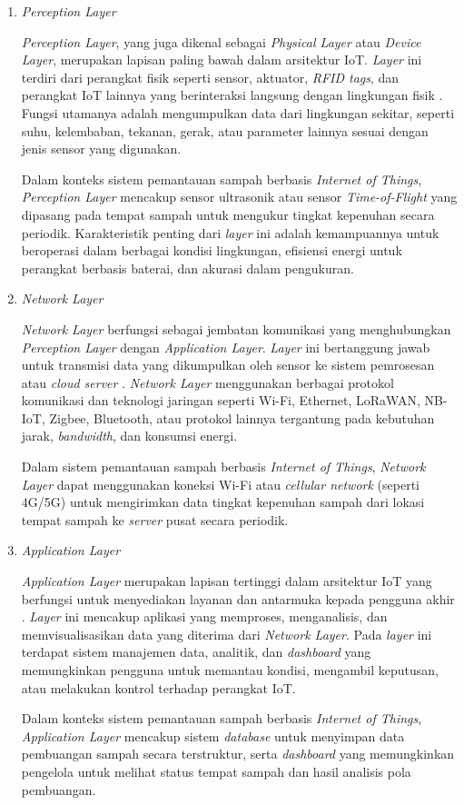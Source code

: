 \begin{enumerate}
  \item \textit{Perception Layer}

  \textit{Perception Layer}, yang juga dikenal sebagai \textit{Physical Layer} atau \textit{Device Layer}, merupakan lapisan paling bawah dalam arsitektur IoT. \textit{Layer} ini terdiri dari perangkat fisik seperti sensor, aktuator, \textit{RFID tags}, dan perangkat IoT lainnya yang berinteraksi langsung dengan lingkungan fisik \autocite{alfuqaha2015}. Fungsi utamanya adalah mengumpulkan data dari lingkungan sekitar, seperti suhu, kelembaban, tekanan, gerak, atau parameter lainnya sesuai dengan jenis sensor yang digunakan.

  Dalam konteks sistem pemantauan sampah berbasis \textit{Internet of Things}, \textit{Perception Layer} mencakup sensor ultrasonik atau sensor \textit{Time-of-Flight} yang dipasang pada tempat sampah untuk mengukur tingkat kepenuhan secara periodik. Karakteristik penting dari \textit{layer} ini adalah kemampuannya untuk beroperasi dalam berbagai kondisi lingkungan, efisiensi energi untuk perangkat berbasis baterai, dan akurasi dalam pengukuran.

  \item \textit{Network Layer}

  \textit{Network Layer} berfungsi sebagai jembatan komunikasi yang menghubungkan \textit{Perception Layer} dengan \textit{Application Layer}. \textit{Layer} ini bertanggung jawab untuk transmisi data yang dikumpulkan oleh sensor ke sistem pemrosesan atau \textit{cloud server} \autocite{alfuqaha2015}. \textit{Network Layer} menggunakan berbagai protokol komunikasi dan teknologi jaringan seperti Wi-Fi, Ethernet, LoRaWAN, NB-IoT, Zigbee, Bluetooth, atau protokol lainnya tergantung pada kebutuhan jarak, \textit{bandwidth}, dan konsumsi energi.

  Dalam sistem pemantauan sampah berbasis \textit{Internet of Things}, \textit{Network Layer} dapat menggunakan koneksi Wi-Fi atau \textit{cellular network} (seperti 4G/5G) untuk mengirimkan data tingkat kepenuhan sampah dari lokasi tempat sampah ke \textit{server} pusat secara periodik.

  \item \textit{Application Layer}

  \textit{Application Layer} merupakan lapisan tertinggi dalam arsitektur IoT yang berfungsi untuk menyediakan layanan dan antarmuka kepada pengguna akhir \autocite{alfuqaha2015}. \textit{Layer} ini mencakup aplikasi yang memproses, menganalisis, dan memvisualisasikan data yang diterima dari \textit{Network Layer}. Pada \textit{layer} ini terdapat sistem manajemen data, analitik, dan \textit{dashboard} yang memungkinkan pengguna untuk memantau kondisi, mengambil keputusan, atau melakukan kontrol terhadap perangkat IoT.

  Dalam konteks sistem pemantauan sampah berbasis \textit{Internet of Things}, \textit{Application Layer} mencakup sistem \textit{database} untuk menyimpan data pembuangan sampah secara terstruktur, serta \textit{dashboard} yang memungkinkan pengelola untuk melihat status tempat sampah dan hasil analisis pola pembuangan.
\end{enumerate}

